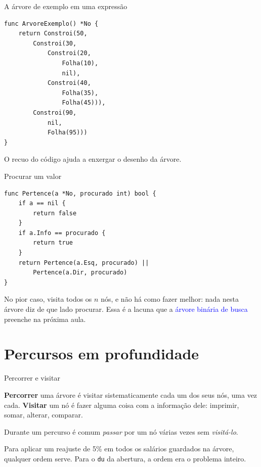 \documentclass{beamer}
\newcommand{\tcb}[1]{\textcolor{blue}{#1}}
\begin{document}
\begin{frame}[fragile]{A árvore de exemplo em uma expressão}
  \begin{verbatim}
func ArvoreExemplo() *No {
    return Constroi(50,
        Constroi(30,
            Constroi(20,
                Folha(10),
                nil),
            Constroi(40,
                Folha(35),
                Folha(45))),
        Constroi(90,
            nil,
            Folha(95)))
}
  \end{verbatim}

  \vspace{0.2cm}
  O recuo do código ajuda a enxergar o desenho da árvore.
\end{frame}

\begin{frame}[fragile]{Procurar um valor}
  \begin{verbatim}
func Pertence(a *No, procurado int) bool {
    if a == nil {
        return false
    }
    if a.Info == procurado {
        return true
    }
    return Pertence(a.Esq, procurado) ||
        Pertence(a.Dir, procurado)
}
  \end{verbatim}

  \vspace{0.3cm}
  No pior caso, visita todos os $n$ nós, e não há como fazer melhor: nada nesta
  árvore diz de que lado procurar. Essa é a lacuna que a \tcb{árvore binária de
    busca} preenche na próxima aula.
\end{frame}

\section{Percursos em profundidade}

\begin{frame}{Percorrer e visitar}
  \begin{block}{}
    \textbf{Percorrer} uma árvore é visitar sistematicamente cada um dos seus
    nós, uma vez cada. \textbf{Visitar} um nó é fazer alguma coisa com a
    informação dele: imprimir, somar, alterar, comparar.
  \end{block}

  \vspace{0.4cm}
  Durante um percurso é comum \textit{passar} por um nó várias vezes sem
  \textit{visitá-lo}.

  \vspace{0.4cm}
  Para aplicar um reajuste de 5\% em todos os salários guardados na árvore,
  qualquer ordem serve. Para o \texttt{du} da abertura, a ordem era o problema
  inteiro.
\end{frame}
\end{document}
